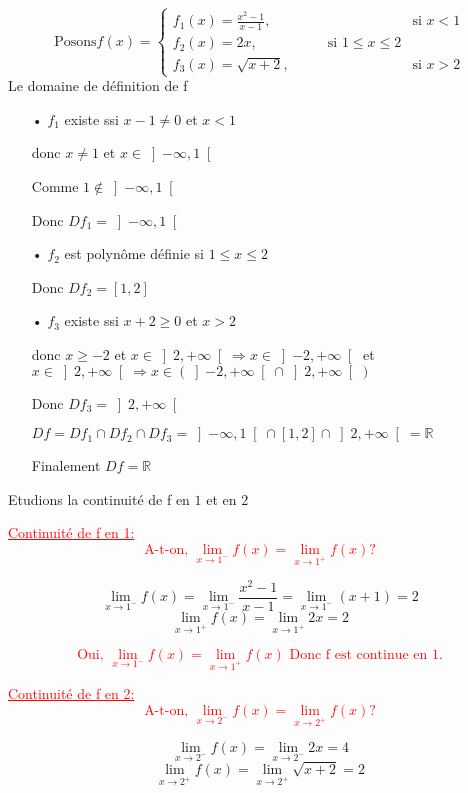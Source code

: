 \documentclass[12pt]{article}
\begin{document}
\[\text{Posons} f(x) = \begin{cases} 
  f_{1}(x)=\frac{x^2-1}{x-1}, & \text{si } x < 1 \\
   f_{2}(x)=2x,\quad\quad\quad\quad\quad \text{si } 1 \leq x \leq 2\\
  f_{3}(x)=\sqrt{x+2}, & \text{si } x > 2
\end{cases} \]
Le domaine de définition de f
\begin{itemize}
\item[•] $f_{1}$ existe ssi  $x-1\neq0$ et $x < 1$

donc $x\neq 1$ et $x \in \left] -\infty, 1\right[$

Comme  $1 \notin \left] -\infty, 1\right[$

Donc $Df_{1}=\left] -\infty, 1\right[$
\item[•] $f_{2}$ est polynôme définie si $1 \leq x \leq 2$

Donc $Df_{2}=\left[  1, 2\right] $
\item[•] $f_{3}$ existe ssi $x+2\geq 0$ et $x > 2$

donc $x\geq -2$ et $x \in \left]2, +\infty\right[  \Rightarrow x \in\left]-2, +\infty\right[$ et $x \in \left]2, +\infty\right[ \Rightarrow x\in (\left]-2, +\infty\right[\cap\left]2, +\infty\right[)$

Donc $Df_{3}=\left]2, +\infty\right[ $

$Df=Df_{1} \cap Df_{2} \cap Df_{3}=\left]-\infty, 1\right[\cap\left[  1, 2\right] \cap\left]2, +\infty\right[=\mathbb{R}$

Finalement $Df=\mathbb{R}$
\end{itemize}
Etudions la continuité de f en $1$ et en $2$

\textcolor{red}{\underline{Continuité de f en 1:}}
\textcolor{red}{\[\text{A-t-on, } \lim_{x \to 1^{-}}f(x)=\lim_{x \to 1^{+}}f(x) ?\]}

\[\lim_{x \to 1^{-}}f(x)=\lim_{x \to 1^{-}}\frac{x^2-1}{x-1}=\lim_{x \to 1^{-}}(x+1)=2\]
\[\lim_{x \to 1^{+}}f(x)=\lim_{x \to 1^{+}}2x=2\]

\textcolor{red}{\[\text{Oui, } \lim_{x \to 1^{-}}f(x)=\lim_{x \to 1^{+}}f(x)\text{ Donc f est continue en 1.}\]}

\textcolor{red}{\underline{Continuité de f en 2:}}
\textcolor{red}{\[\text{A-t-on, } \lim_{x \to 2^{-}}f(x)=\lim_{x \to 2^{+}}f(x) ?\]}

\[\lim_{x \to 2^{-}}f(x)=\lim_{x \to 2^{-}}2x=4\]
\[\lim_{x \to 2^{+}}f(x)=\lim_{x \to 2^{+}}\sqrt{x+2}=2\]
\end{document}
